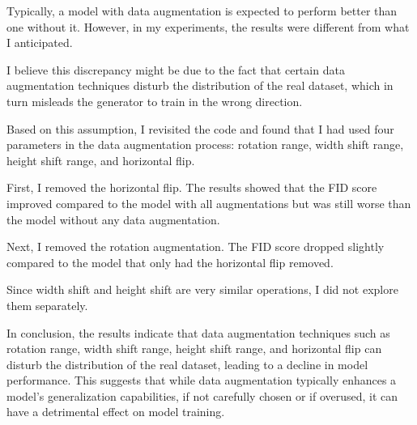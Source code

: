 Typically, a model with data augmentation is expected to perform better than one without it. However, 
in my experiments, the results were different from what I anticipated.

I believe this discrepancy might be due to the fact that certain data augmentation techniques disturb the 
distribution of the real dataset, which in turn misleads the generator to train in the wrong direction.

Based on this assumption, I revisited the code and found that I had used four parameters in the data augmentation 
process: rotation range, width shift range, height shift range, and horizontal flip.

First, I removed the horizontal flip. The results showed that the FID score improved compared to the model 
with all augmentations but was still worse than the model without any data augmentation.

Next, I removed the rotation augmentation. The FID score dropped slightly compared to the model that only had the horizontal flip removed.

Since width shift and height shift are very similar operations, I did not explore them separately.

In conclusion, the results indicate that data augmentation techniques such as rotation range, width shift range, height 
shift range, and horizontal flip can disturb the distribution of the real dataset, leading to a decline in model 
performance. This suggests that while data augmentation typically enhances a model’s generalization capabilities, 
if not carefully chosen or if overused, it can have a detrimental effect on model training.

